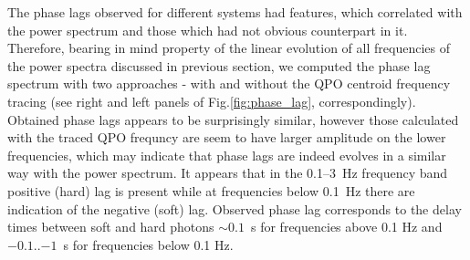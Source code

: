 \documentclass[a4paper,fleqn,usenatbib]{mnras}
\begin{document}
The phase lags observed for different systems had features, which correlated with the power spectrum and those which had not obvious counterpart in it. 
Therefore, bearing in mind property of the linear evolution of all frequencies of the power spectra discussed in previous section, we computed the phase lag spectrum with two approaches - with and without the QPO centroid frequency tracing (see right and left panels of Fig.\ref{fig:phase_lag}, correspondingly).
Obtained phase lags appears to be surprisingly similar, however those calculated with the traced QPO frequncy are seem to have larger amplitude on the lower frequencies, which may indicate that phase lags are indeed evolves in a similar way with the power spectrum. 
It appears that in the 0.1--3~Hz frequency band positive (hard) lag is present while at frequencies below 0.1~Hz there are indication of the negative (soft) lag.
Observed phase lag corresponds to the delay times between soft and hard photons $\sim0.1$~s for frequencies above 0.1 Hz and $-0.1$..$-1$~s for frequencies below 0.1 Hz.
\end{document}
